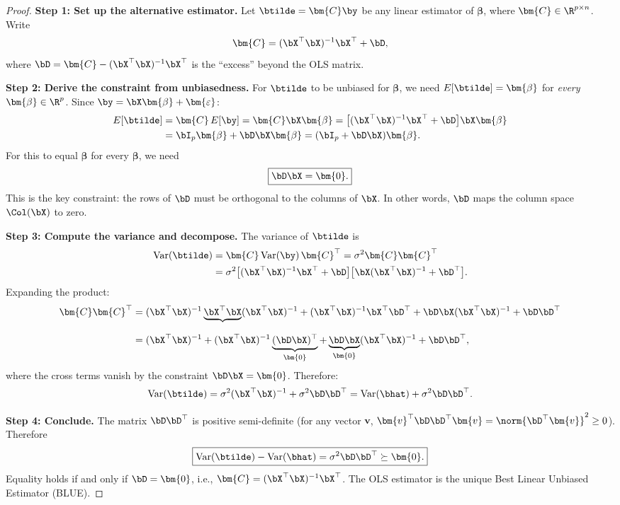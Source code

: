 \begin{proof}
\textbf{Step 1: Set up the alternative estimator.}
Let $\btilde = \bm{C}\by$ be any linear estimator of $\bm{\beta}$, where
$\bm{C}\in\R^{p\times n}$.  Write
\[
  \bm{C} = (\bX^\top\bX)^{-1}\bX^\top + \bD,
\]
where $\bD = \bm{C} - (\bX^\top\bX)^{-1}\bX^\top$ is the ``excess'' beyond
the OLS matrix.

\medskip
\noindent\textbf{Step 2: Derive the constraint from unbiasedness.}
For $\btilde$ to be unbiased for $\bm{\beta}$, we need
$E[\btilde] = \bm{\beta}$ for \emph{every} $\bm{\beta}\in\R^p$.
Since $\by = \bX\bm{\beta} + \bm{\varepsilon}$:
\begin{align*}
  E[\btilde]
  &= \bm{C}\,E[\by]
   = \bm{C}\bX\bm{\beta}
   = \bigl[(\bX^\top\bX)^{-1}\bX^\top + \bD\bigr]\bX\bm{\beta} \\
  &= \bI_p\bm{\beta} + \bD\bX\bm{\beta}
   = (\bI_p + \bD\bX)\bm{\beta}.
\end{align*}
For this to equal $\bm{\beta}$ for every $\bm{\beta}$, we need
\begin{equation}\label{eq:gm-constraint}
  \boxed{\bD\bX = \bm{0}.}
\end{equation}
This is the key constraint: the rows of $\bD$ must be orthogonal to the
columns of $\bX$.  In other words, $\bD$ maps the column space $\Col(\bX)$
to zero.

\medskip
\noindent\textbf{Step 3: Compute the variance and decompose.}
The variance of $\btilde$ is
\begin{align*}
  \text{Var}(\btilde)
  &= \bm{C}\,\text{Var}(\by)\,\bm{C}^\top
   = \sigma^2\bm{C}\bm{C}^\top \\
  &= \sigma^2\bigl[(\bX^\top\bX)^{-1}\bX^\top + \bD\bigr]
              \bigl[\bX(\bX^\top\bX)^{-1} + \bD^\top\bigr].
\end{align*}
Expanding the product:
\begin{align*}
  \bm{C}\bm{C}^\top
  &= (\bX^\top\bX)^{-1}\underbrace{\bX^\top\bX}_{}(\bX^\top\bX)^{-1}
     + (\bX^\top\bX)^{-1}\bX^\top\bD^\top
     + \bD\bX(\bX^\top\bX)^{-1}
     + \bD\bD^\top \\
  &= (\bX^\top\bX)^{-1}
     + (\bX^\top\bX)^{-1}\underbrace{(\bD\bX)^\top}_{\bm{0}}
     + \underbrace{\bD\bX}_{\bm{0}}(\bX^\top\bX)^{-1}
     + \bD\bD^\top,
\end{align*}
where the cross terms vanish by the constraint $\bD\bX = \bm{0}$.
Therefore:
\[
  \text{Var}(\btilde)
  = \sigma^2(\bX^\top\bX)^{-1} + \sigma^2\bD\bD^\top
  = \text{Var}(\bhat) + \sigma^2\bD\bD^\top.
\]

\medskip
\noindent\textbf{Step 4: Conclude.}
The matrix $\bD\bD^\top$ is positive semi-definite (for any vector $\bm{v}$,
$\bm{v}^\top\bD\bD^\top\bm{v} = \norm{\bD^\top\bm{v}}^2 \ge 0$).
Therefore
\[
  \boxed{
  \text{Var}(\btilde) - \text{Var}(\bhat)
  = \sigma^2\bD\bD^\top \succeq \bm{0}.
  }
\]
Equality holds if and only if $\bD = \bm{0}$, i.e., $\bm{C} = (\bX^\top\bX)^{-1}\bX^\top$.
The OLS estimator is the unique Best Linear Unbiased Estimator (BLUE).
\end{proof}

